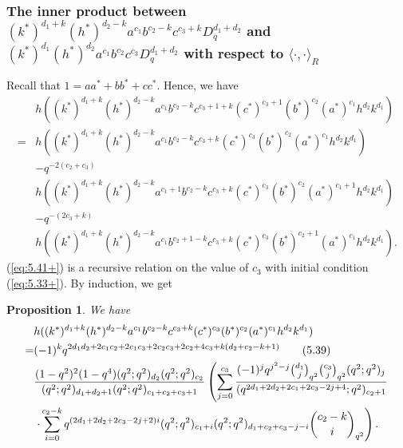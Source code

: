 \documentclass[table,a4paper,reqno]{amsart}
\numberwithin{equation}{section}
\newtheorem{proposition}[theorem]{Proposition}
\theoremstyle{definition}
\begin{document}
\subsubsection{The inner product between $(k^*)^{d_1+k}(h^*)^{d_2-k}a^{c_1}b^{c_2-k}c^{c_3+k}D_q^{d_1+d_2}$ and\\ $(k^*)^{d_1}(h^*)^{d_2}a^{c_1}b^{c_2}c^{c_3}D_q^{d_1+d_2}$ with respect to $\langle \cdot,\cdot\rangle_R$}
Recall that $1=aa^*+bb^*+cc^*$. Hence, we have
\begin{equation}\label{eq:5.41+}
    \begin{split}
        &h((k^*)^{d_1+k}(h^*)^{d_2-k}a^{c_1}b^{c_2-k}c^{c_3+1+k}(c^*)^{c_3+1}(b^*)^{c_2}(a^*)^{c_1}h^{d_2}k^{d_1})\\
        =&h((k^*)^{d_1+k}(h^*)^{d_2-k}a^{c_1}b^{c_2-k}c^{c_3+k}(c^*)^{c_3}(b^*)^{c_2}(a^*)^{c_1}h^{d_2}k^{d_1})\\
        &-q^{-2(c_2+c_3)}\\
        &h((k^*)^{d_1+k}(h^*)^{d_2-k}a^{c_1+1}b^{c_2-k}c^{c_3+k}(c^*)^{c_3}(b^*)^{c_2}(a^*)^{c_1+1}h^{d_2}k^{d_1})\\
        &-q^{-(2c_3+k)}\\
        &h((k^*)^{d_1+k}(h^*)^{d_2-k}a^{c_1}b^{c_2+1-k}c^{c_3+k}(c^*)^{c_3}(b^*)^{c_2+1}(a^*)^{c_1}h^{d_2}k^{d_1}).
    \end{split}
\end{equation}
(\ref{eq:5.41+}) is a recursive relation on the value of $c_3$ with initial condition (\ref{eq:5.33+}). By induction, we get
\begin{proposition}\label{prop:5.6}
    We have
    \begin{align}\label{eq:5.35+}\stepcounter{equation}
            &h((k^*)^{d_1+k}(h^*)^{d_2-k}a^{c_1}b^{c_2-k}c^{c_3+k}(c^*)^{c_3}(b^*)^{c_2}(a^*)^{c_1}h^{d_2}k^{d_1})\notag\\
            =&(-1)^kq^{2d_1d_2+2c_1c_2+2c_1c_3+2c_2c_3+2c_2+4c_3+k(d_2+c_2-k+1)}\tag{5.39}\\
            &\frac{(1-q^2)^2(1-q^4)(q^2;q^2)_{d_2}(q^2;q^2)_{c_2}}{(q^2;q^2)_{d_1+d_2+1}(q^2;q^2)_{c_1+c_2+c_3+1}}\left(\sum_{j=0}^{c_3}\frac{(-1)^{j}q^{j^2-j}{d_1\choose j}_{q^{2}}{c_3\choose j}_{q^2}(q^2;q^2)_{j}}{(q^{2d_1+2d_2+2c_1+2c_3-2j+4};q^2)_{c_2+1}}\right.\notag\\
            &\left.\cdot\sum_{i=0}^{c_2-k}q^{(2d_1+2d_2+2c_3-2j+2)i}(q^2;q^2)_{c_1+i}(q^2;q^2)_{d_1+c_2+c_3-j-i}{c_2-k\choose i}_{q^2}\right).\notag
    \end{align}
\end{proposition}
\end{document}
